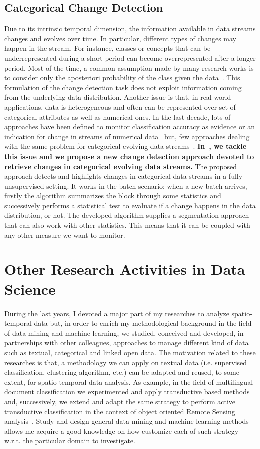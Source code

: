 \subsection{Categorical Change Detection}
Due to its intrinsic temporal dimension, the information available in data streams changes and evolves over time. 
In particular, different types of changes may happen in the stream. For instance, classes or concepts that can be underrepresented during a short period can become overrepresented after a longer period. 
Most of the time, a common assumption made by many research works is to consider only the aposteriori probability of the class given the data~\cite{Gama04,BifetRPHZ13}. This formulation of the change detection task does not exploit information coming from the underlying data distribution. Another issue is that, in real world applications, data is heterogeneous and often can be represented over set of categorical attributes as well as numerical ones.
In the last decade, lots of approaches have been defined to monitor classification accuracy as evidence or an indication for change in streams of numerical data~\cite{BifetRPHZ13} but, few approaches dealing with the same problem for categorical evolving data streams~\cite{CaoH13}. \textbf{In~\cite{IencoBPP14}, we tackle this issue and we propose a new change detection approach devoted to retrieve changes in categorical evolving data streams.}
The proposed approach detects and highlights changes in categorical data streams in a fully unsupervised setting. 
It works in the batch scenario: when a new batch arrives, firstly the algorithm summarizes the block through some statistics and successively performs a statistical test to evaluate if a change happens in the data distribution, or not.
The developed algorithm supplies a segmentation approach that can also work with other statistics. This means that it can be coupled with any other measure we want to monitor.



\section{Other Research Activities in Data Science} 
During the last years, I devoted a major part of my researches to analyze spatio-temporal data but, in order to enrich my methodological background in the field of data mining and machine learning, we studied, conceived and developed, in partnerships with other colleagues, approaches to manage different kind of data such as textual, categorical and linked open data. The motivation related to these researches is that, a methodology we can apply on textual data (i.e. supervised classification, clustering algorithm, etc.) can be adapted and reused, to some extent, for spatio-temporal data analysis.
As example, in the field of multilingual document classification we experimented and apply transductive based methods~\cite{RomeoIT15} and, successively, we extend and adapt the same strategy to perform active transductive classification in the context of object oriented Remote Sensing analysis~\cite{Guttler16}. Study and design general data mining and machine learning methods allows me acquire a good knowledge on how customize each of such strategy w.r.t. the particular domain to investigate. 

